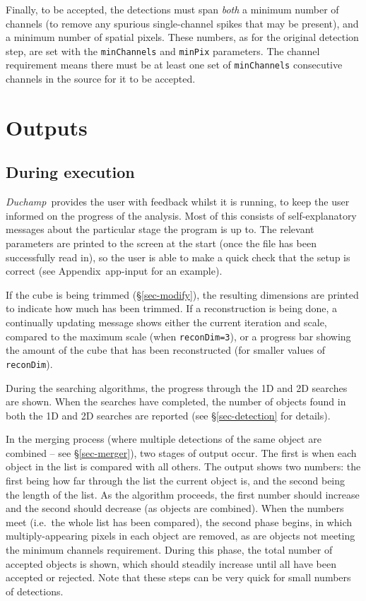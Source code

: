 \documentclass[12pt,a4paper]{article}
\newcommand{\ie}{i.e.\ }
\newcommand{\duchamp}{\emph{Duchamp}}
\begin{document}
Finally, to be accepted, the detections must span \emph{both} a minimum
number of channels (to remove any spurious single-channel spikes that
may be present), and a minimum number of spatial pixels. These
numbers, as for the original detection step, are set with the
\texttt{minChannels} and \texttt{minPix} parameters. The channel
requirement means there must be at least one set of \texttt{minChannels}
consecutive channels in the source for it to be accepted.

\section{Outputs}
\label{sec-output}

\subsection{During execution}

\duchamp\ provides the user with feedback whilst it is running, to
keep the user informed on the progress of the analysis. Most of this
consists of self-explanatory messages about the particular stage the
program is up to. The relevant parameters are printed to the screen at
the start (once the file has been successfully read in), so the user
is able to make a quick check that the setup is correct (see
Appendix~{app-input} for an example).

If the cube is being trimmed (\S\ref{sec-modify}), the resulting
dimensions are printed to indicate how much has been trimmed. If a
reconstruction is being done, a continually updating message shows
either the current iteration and scale, compared to the maximum scale
(when \texttt{reconDim=3}), or a progress bar showing the amount of
the cube that has been reconstructed (for smaller values of
\texttt{reconDim}).

During the searching algorithms, the progress through the 1D and 2D
searches are shown. When the searches have completed,
the number of objects found in both the 1D and 2D searches are
reported (see \S\ref{sec-detection} for details).

In the merging process (where multiple detections of the same object
are combined -- see \S\ref{sec-merger}), two stages of output
occur. The first is when each object in the list is compared with all
others. The output shows two numbers: the first being how far through
the list the current object is, and the second being the length of the
list. As the algorithm proceeds, the first number should increase and
the second should decrease (as objects are combined). When the numbers
meet (\ie the whole list has been compared), the second phase begins,
in which multiply-appearing pixels in each object are removed, as are
objects not meeting the minimum channels requirement. During this
phase, the total number of accepted objects is shown, which should
steadily increase until all have been accepted or rejected. Note that
these steps can be very quick for small numbers of detections.
\end{document}
